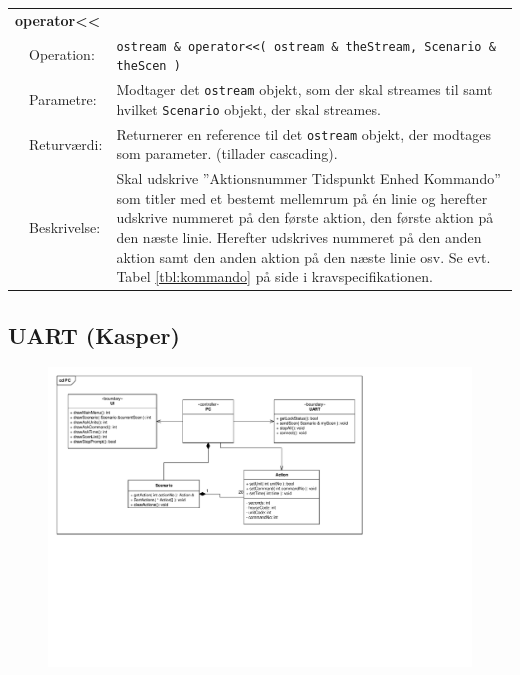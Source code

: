 \begin{table}[h]
\begin{tabularx}{\textwidth}{p{0.6 cm} l X} %
\multicolumn{3}{l}{\textbf{operator{<}{<}}}\\
& Operation: & 
\texttt{ostream \& operator{<}{<}( ostream \& theStream, Scenario \& theScen )}  
\\ & Parametre: & 
Modtager det \texttt{ostream} objekt, som der skal streames til samt hvilket \texttt{Scenario} objekt, der skal streames.
\\ & Returværdi: & 
Returnerer en reference til det \texttt{ostream} objekt, der modtages som parameter. (tillader cascading).
\\ & Beskrivelse: & 
Skal udskrive ''Aktionsnummer  Tidspunkt  Enhed  Kommando'' som titler med et bestemt mellemrum på én linie og herefter udskrive nummeret på den første aktion, den første aktion på den næste linie. Herefter udskrives nummeret på den anden aktion samt den anden aktion på den næste linie osv. Se evt. Tabel \ref{tbl:kommando} på side \pageref{tbl:kommando} i kravspecifikationen.
\\ \end{tabularx}
\end{table}


\subsection{UART (Kasper)}

\begin{figure}[h]
\centering
\includegraphics[scale=1,clip=true, trim=448 440 225 50]{Systemarkitektur/diagrammer/PC_KlasseDiagram} %
\end{figure}

